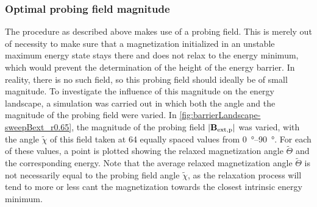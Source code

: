 \documentclass[11pt,a4paper,english]{article}
\begin{document}
\subsubsection{Optimal probing field magnitude}
The procedure as described above makes use of a probing field. This is merely out of necessity to make sure that a magnetization initialized in an unstable maximum energy state stays there and does not relax to the energy minimum, which would prevent the determination of the height of the energy barrier. In reality, there is no such field, so this probing field should ideally be of small magnitude. To investigate the influence of this magnitude on the energy landscape, a simulation was carried out in which both the angle and the magnitude of the probing field were varied. In \cref{fig:barrierLandscape-sweepBext_r0.65}, the magnitude of the probing field $\abs{\vb{B_\mathrm{ext,p}}}$ was varied, with the angle $\widetilde{\chi}$ of this field taken at 64 equally spaced values from \SIrange{0}{90}{\degree}. For each of these values, a point is plotted showing the relaxed magnetization angle $\widetilde{\Theta}$ and the corresponding energy. Note that the average relaxed magnetization angle $\widetilde{\Theta}$ is not necessarily equal to the probing field angle $\widetilde{\chi}$, as the relaxation process will tend to more or less cant the magnetization towards the closest intrinsic energy minimum. \par
\end{document}
